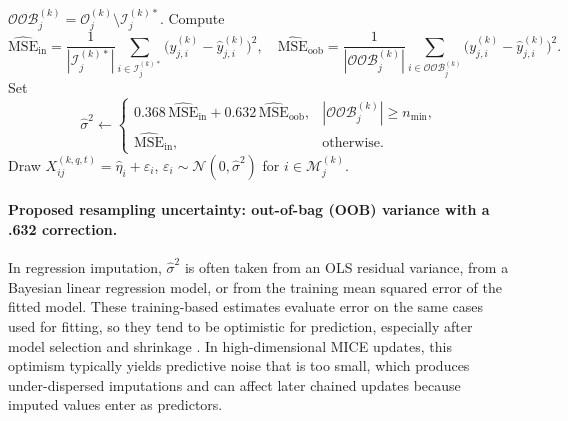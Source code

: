 \documentclass[12pt]{article}
\begin{document}
\begin{algorithm}[t]
\begin{algorithmic}[1]
  $\mathcal{OOB}^{(k)}_j=\mathcal{O}^{(k)}_j\setminus\mathcal{I}^{(k)\ast}_j$.
  Compute
  \[
\widehat{\mathrm{MSE}}_{\mathrm{in}}=\frac{1}{|\mathcal{I}^{(k)\ast}_j|}\sum_{i\in\mathcal{I}^{(k)\ast}_j}\big(y^{(k)}_{j,i}-\hat{y}^{(k)}_{j,i}\big)^2,\quad
\widehat{\mathrm{MSE}}_{\mathrm{oob}}=\frac{1}{|\mathcal{OOB}^{(k)}_j|}\sum_{i\in\mathcal{OOB}^{(k)}_j}\big(y^{(k)}_{j,i}-\hat{y}^{(k)}_{j,i}\big)^2.
\]
  Set
  \[
  \hat{\sigma}^2 \leftarrow
  \begin{cases}
    0.368\,\widehat{\mathrm{MSE}}_{\mathrm{in}} + 0.632\,\widehat{\mathrm{MSE}}_{\mathrm{oob}}, & |\mathcal{OOB}^{(k)}_j|\ge n_{\min},\\
    \widehat{\mathrm{MSE}}_{\mathrm{in}}, & \text{otherwise}.
  \end{cases}
  \]
  \State Draw $X^{(k,q,t)}_{ij}=\hat{\eta}_i+\varepsilon_i$, $\varepsilon_i\sim\mathcal{N}(0,\hat{\sigma}^2)$ for $i\in\mathcal{M}^{(k)}_j$.
\EndIf
\end{algorithmic}
\end{algorithm}

\paragraph{Proposed resampling uncertainty: out-of-bag (OOB) variance with a .632 correction.} In regression imputation, $\hat{\sigma}^2$ is often taken from an OLS residual variance, from a Bayesian linear regression model, or from the training mean squared error of the fitted model. These training-based estimates evaluate error on the same cases used for fitting, so they tend to be optimistic for prediction, especially after model selection and shrinkage \citep{breiman_out--bag_1996}. In high-dimensional MICE updates, this optimism typically yields predictive noise that is too small, which produces under-dispersed imputations and can affect later chained updates because imputed values enter as predictors.
\end{document}
